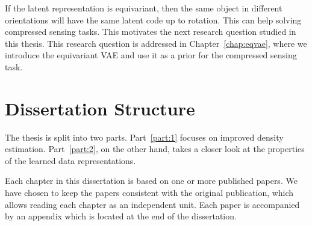 If the latent representation is equivariant, then the same object in different orientations will have the same latent code up to rotation. This can help solving compressed sensing tasks. 
This motivates the next research question studied in this thesis. 
This research question is addressed in Chapter~\ref{chap:eqvae}, where we introduce the equivariant VAE and use it as a prior for the compressed sensing task. 

\section{Dissertation Structure}
The thesis is split into two parts. Part~\ref{part:1} focuses on improved density estimation. Part~\ref{part:2}, on the other hand, takes a closer look at the properties of the learned data representations. 

Each chapter in this dissertation is based on one or more published papers.
We have chosen to keep the papers consistent with the original publication, which allows reading each chapter as an independent unit. 
Each paper is accompanied by an appendix which is located at the end of the dissertation.



